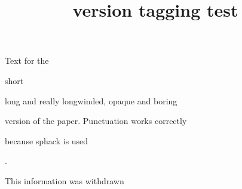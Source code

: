 \documentclass{article}
\title{version tagging test}
\begin{document}
Text for the
\begin{abridged}
short
\end{abridged}
\begin{unabridged}
long and really longwinded, opaque and boring
\end{unabridged}
version of the paper. Punctuation works correctly\begin{unabridged}
because sphack is used\end{unabridged}.

\begin{redact}This information was withdrawn\end{redact}
\end{document}
